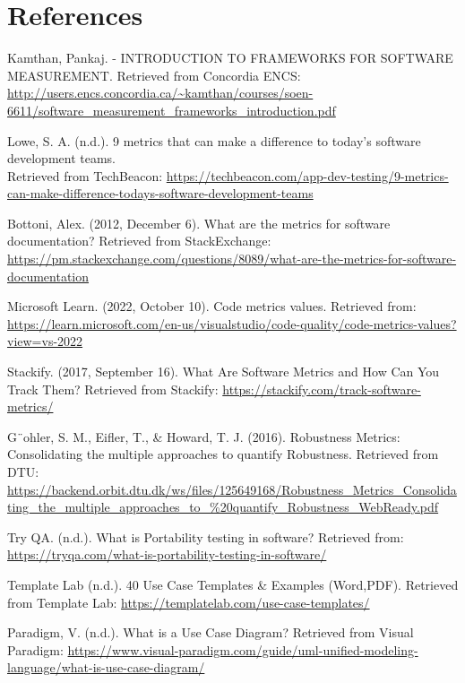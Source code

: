 \section{References}

    \begin{enumerate}[label={[\arabic*]}]
        \item Kamthan, Pankaj. - INTRODUCTION TO FRAMEWORKS FOR SOFTWARE MEASUREMENT. Retrieved from Concordia ENCS: \url{http://users.encs.concordia.ca/~kamthan/courses/soen-6611/software_measurement_frameworks_introduction.pdf}

        \item Lowe, S. A. (n.d.). 9 metrics that can make a difference to today's software development teams.\\ Retrieved from TechBeacon: \url{https://techbeacon.com/app-dev-testing/9-metrics-can-make-difference-todays-software-development-teams}

        \item Bottoni, Alex. (2012, December 6). What are the metrics for software documentation? Retrieved from StackExchange: \url{https://pm.stackexchange.com/questions/8089/what-are-the-metrics-for-software-documentation}

        \item Microsoft Learn. (2022, October 10). Code metrics values. Retrieved from: \url{https://learn.microsoft.com/en-us/visualstudio/code-quality/code-metrics-values?view=vs-2022}

        \item Stackify. (2017, September 16). What Are Software Metrics and How Can You Track Them? Retrieved from Stackify: \url{https://stackify.com/track-software-metrics/}

        \item  G¨ohler, S. M., Eifler, T., \& Howard, T. J. (2016). Robustness Metrics: Consolidating the multiple approaches to quantify Robustness. Retrieved from DTU: \url{https://backend.orbit.dtu.dk/ws/files/125649168/Robustness_Metrics_Consolidating_the_multiple_approaches_to_\%20quantify_Robustness_WebReady.pdf}

        \item Try QA. (n.d.). What is Portability testing in software? Retrieved from: \url{https://tryqa.com/what-is-portability-testing-in-software/}

        \item Template Lab (n.d.). 40 Use Case Templates \& Examples (Word,PDF). Retrieved from Template Lab: \url{https://templatelab.com/use-case-templates/}

        \item Paradigm, V. (n.d.). What is a Use Case Diagram? Retrieved from Visual Paradigm: \url{https://www.visual-paradigm.com/guide/uml-unified-modeling-language/what-is-use-case-diagram/}
  
    \end{enumerate}